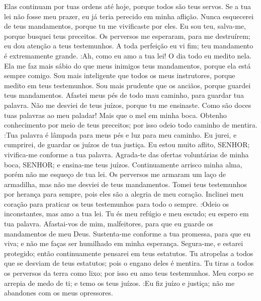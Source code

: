 {  Elas continuam por tuas ordens até hoje, porque todos são teus servos.
  Se a tua lei não fosse meu prazer, eu já teria perecido em minha aflição.
  Nunca esquecerei de teus mandamentos, porque tu me vivificaste por eles.
  Eu sou teu, salva-me, porque busquei teus preceitos.
  Os perversos me esperaram, para me destruírem;
{} eu dou atenção a teus testemunhos.
  A toda perfeição eu vi fim;
{} teu mandamento é extremamente grande.
   :Ah, como eu amo a tua lei! O dia todo eu medito nela.
  Ela me faz mais sábio do que meus inimigos
{} teus mandamentos, porque ela está sempre comigo.
  Sou mais inteligente que todos os meus instrutores, porque medito em teus testemunhos.
  Sou mais prudente que os anciãos, porque guardei teus mandamentos.
  Afastei meus pés de todo mau caminho, para guardar tua palavra.
  Não me desviei de teus juízos, porque tu me ensinaste.
  Como são doces tuas palavras ao meu paladar! Mais que o mel em minha boca.
  Obtenho conhecimento por meio de teus preceitos; por isso odeio todo caminho de mentira.
   :Tua palavra é lâmpada para meus pés e luz para meu caminho.
  Eu jurei, e
{} cumprirei, de guardar os juízos de tua justiça.
  Eu estou muito aflito, SENHOR; vivifica-me conforme a tua palavra.
  Agrada-te das ofertas voluntárias de minha boca, SENHOR; e ensina-me teus juízos.
  Continuamente arrisco minha alma, porém não me esqueço de tua lei.
  Os perversos me armaram um laço de armadilha, mas não me desviei de teus mandamentos.
  Tomei teus testemunhos por herança para sempre, pois eles são a alegria de meu coração.
  Inclinei meu coração para praticar os teus testemunhos para todo o sempre.
   :Odeio os inconstantes, mas amo a tua lei.
  Tu és meu refúgio e meu escudo; eu espero em tua palavra.
  Afastai-vos de mim, malfeitores, para que eu guarde os mandamentos de meu Deus.
  Sustenta-me conforme a tua promessa, para que eu viva; e não me faças ser humilhado em minha esperança.
  Segura-me, e estarei protegido; então continuamente pensarei em teus estatutos.
  Tu atropelas a todos que se desviam de teus estatutos; pois o engano deles é mentira.
  Tu tiras a todos os perversos da terra como
{} lixo; por isso eu amo teus testemunhos.
  Meu corpo se arrepia de medo de ti; e temo os teus juízos.
   :Eu fiz juízo e justiça; não me abandones com os meus opressores.
}
